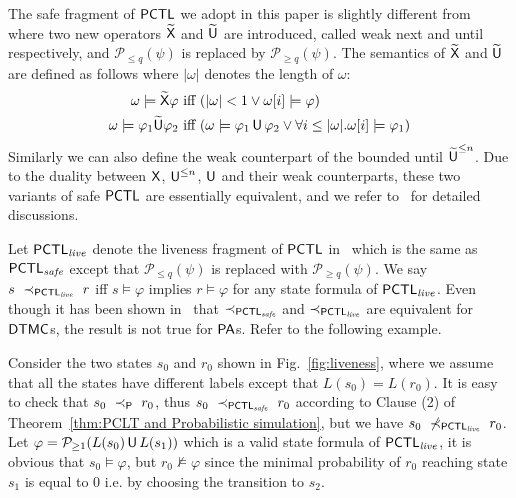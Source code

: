 \documentclass{LMCS}
\def\phi{\varphi}
\DeclareMathOperator{\U}{\text{\sf U}}
\DeclareMathOperator{\X}{\text{\sf X}}
\newcommand{\Si}{\prec}
\newcommand{\PA}{{\sf PA}}
\newcommand{\SP}{\ensuremath{\prec_{{\sf P}}}}
\newcommand{\DTMC}{{\sf DTMC}}
\newcommand{\PCTL}{{\sf PCTL}}
\newcommand{\MC}[1]{\mathcal{#1}}
\newcommand{\MI}[1]{\mathit{#1}}
\newcommand{\ABS}[1]{|#1|}
\begin{document}
\begin{rem}
The safe fragment of $\PCTL$ we adopt in this paper is slightly different from~\cite{BaierKHW05} where two new operators $\widetilde{\X}$ and $\widetilde{\U}$ are introduced, called weak next and until respectively, and $\MC{P}_{\leq q}(\psi)$ is replaced by $\MC{P}_{\geq q}(\psi)$. The semantics of $\widetilde{\X}$ and $\widetilde{\U}$ are defined as follows where $\ABS{\omega}$ denotes the length of $\omega$:
\begin{align*}
\omega\models\widetilde{\X}\phi &\text{ iff } (\ABS{\omega}<1\lor\omega[i]\models\phi)\\
\omega\models\phi_1\widetilde{\U}\phi_2&\text{ iff } (\omega\models\phi_1\U\phi_2\lor\forall i\leq\ABS{\omega}.\omega[i]\models\phi_1)
\end{align*}
Similarly we can also define the weak counterpart of the bounded until
$\widetilde{\U}^{\leq n}$. Due to the duality between $\X$, $\U^{\leq n}$,
$\U$ and their weak counterparts, these two variants of safe $\PCTL$
are essentially equivalent, and we refer to~\cite{BaierKHW05} for detailed
discussions.

Let $\PCTL_{\MI{live}}$ denote the liveness fragment of $\PCTL$ in~\cite{BaierKHW05} which is the same as $\PCTL_{\MI{safe}}$ except that $\MC{P}_{\leq q}(\psi)$ is replaced with $\MC{P}_{\geq q}(\psi)$. We say $s~\Si_{\PCTL_{\MI{live}}}~r$ iff $s\models\phi$ implies $r\models\phi$ for any state formula of $\PCTL_{\MI{live}}$. Even though it has been shown in~\cite{BaierKHW05} that $\Si_{\PCTL_{\MI{safe}}}$ and $\Si_{\PCTL_{\MI{live}}}$ are equivalent for $\DTMC$s, the result is not true for $\PA$s. Refer to the following example.
\begin{exa}
  Consider the two states $s_0$ and $r_0$ shown in
  Fig.~\ref{fig:liveness}, where we assume that all the states have
  different labels except that $L(s_0)=L(r_0)$. It is easy to check
  that $s_0~\SP~r_0$, thus $s_0~\Si_{\PCTL_{\MI{safe}}}~r_0$ according
  to Clause (2) of Theorem~\ref{thm:PCLT and Probabilistic
    simulation}, but we have
  $s_0~\not\Si_{\PCTL_{\MI{live}}}~r_0$. Let $\phi=\MC{P}_{\geq
    1}(L(s_0)\U L(s_1))$ which is a valid state formula of
  $\PCTL_{\MI{live}}$, it is obvious that $s_0\models\phi$, but
  $r_0\not\models\phi$ since the minimal probability of $r_0$ reaching
  state $s_1$ is equal to 0 i.e. by choosing the transition to $s_2$.
\end{exa}


\end{rem}
\end{document}
